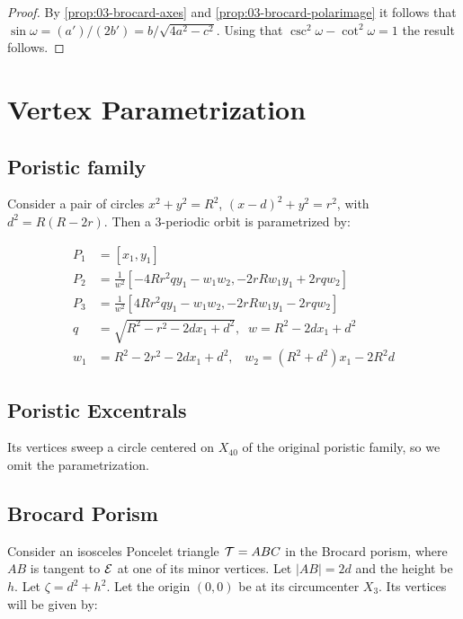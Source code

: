 \begin{proof} By \cref{prop:03-brocard-axes} and \cref{prop:03-brocard-polarimage} it follows that
  $\sin\omega=(a')/(2b')=b/\sqrt{4a^2-c^2}.$
Using that $\csc^2\omega-\cot^2\omega=1$ the result follows.
\end{proof}

\section{Vertex Parametrization}

\subsection{Poristic family}
\label{sec:04-vtx-poristic}

Consider a pair of circles $x^2+y^2=R^2$,
$(x-d)^2+y^2=r^2$, with $d^2=R(R-2r)$. Then a 3-periodic orbit is parametrized by:

\begin{align}
P_1&=[x_1,y_1]\nonumber \\
 P_2&=\frac{1}{w^2} [ -4R r^2 q  y_1 - w_1w_2 , -2r R w_1y_1 + 2 r q w_2 ]\nonumber \\
  P_3 &=  \frac{1}{w^2} [4R r^2 q  y_1 - w_1w_2 , -2r R w_1y_1 - 2 r q w_2 ]\label{eq:04-vtx-poristic} \\
  q&=\sqrt{R^2 - r^2 - 2d x_1  + d^2},\;\; w=R^2 - 2d x_1  + d^2\nonumber 
  \\ w_1&=R^2 - 2r^2 - 2 d x_1 + d^2,\;\;\;
  w_2=(R^2+d^2) x_1 - 2 R^2 d  \nonumber
\end{align}

\subsection{Poristic Excentrals}

Its vertices sweep a circle centered on $X_{40}$ of the original poristic family, so we omit the parametrization.

\subsection{Brocard Porism}

Consider an isosceles Poncelet triangle $\mathcal{T}=ABC$ in the Brocard porism, where $AB$ is tangent to $\mathcal{E}$ at one of its minor vertices. Let $|AB|=2d$ and the height be $h$. Let $\zeta=d^2+h^2$. Let the origin $(0,0)$ be at its circumcenter $X_3$. Its vertices will be given by:

